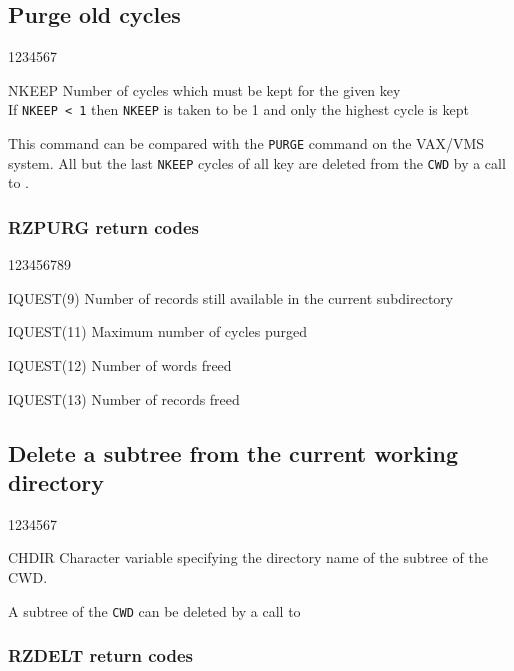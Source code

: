 \subsection{Purge old cycles}


\begin{DLtt}{1234567}
\item[NKEEP]Number of cycles which must be kept for the given key\\
If {\tt NKEEP < 1} then {\tt NKEEP} is taken to be 1 and only the
highest cycle is kept
\end{DLtt}

This command can be compared with 
the {\tt PURGE} command on the VAX/VMS system.
All but the last {\tt NKEEP} cycles of all
key are deleted from the {\tt CWD} by a call to .

\subsubsection*{RZPURG return codes}
\begin{DLtt}{123456789}
\item[IQUEST(9)]Number of records still available in the current subdirectory
\par
\item[IQUEST(11)]Maximum number of cycles purged
\item[IQUEST(12)]Number of words freed
\item[IQUEST(13)]Number of records freed
\end{DLtt}


\subsection{Delete a subtree from the current working directory}

\begin{DLtt}{1234567}
\item[CHDIR]Character variable specifying the directory name of the subtree of
the CWD.
\end{DLtt}

A subtree of the {\tt CWD} can be deleted by a call to 

\subsubsection*{RZDELT return codes}

